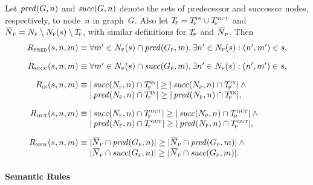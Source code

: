 \begin{definition}
  \def\fT{T_{\!\mathsc{f}}}%
  \def\pT{T_{\!\mathsc{p}}}%
  \def\fNegN{\mkern2mu\overline{\mkern-2mu N}_{\mathsc{f}}}%
  \def\pNegN{\mkern2mu\overline{\mkern-2mu N}_{\mathsc{p}}}%

  Let $\operatorname{\textrm{\textit{pred}}}(G, n)$ and $\operatorname{\textrm{\textit{succ}}}(G, n)$ denote the sets of predecessor and
  successor \glspl{node}, respectively, to \gls{node}~$n$ in \gls{graph}~$G$.
  Also let \mbox{$\fT = \fTin \cup \fTout$} and \mbox{$\fNegN = \fN \setminus
    \fN(s) \setminus \fT$}, with similar definitions for $\pT$ and $\pNegN$.
  Then
  \begin{displaymath}
    \begin{array}{r@{}l}
        \mSynPredRule(s, n, m) \equiv \mbox{}
      & \forall m' \in \pN(s) \cap \mPred(\pG, m),
        \exists n' \in \fN(s) :
        \mPair{n'}{m'} \in s, \\[\abovedisplayskip]

        \mSynSuccRule(s, n, m) \equiv \mbox{}
      & \forall m' \in \pN(s) \cap \mSucc(\pG, m),
        \exists n' \in \fN(s) :
        \mPair{n'}{m'} \in s, \\[\abovedisplayskip]

        \mSynInRule(s, n, m) \equiv \mbox{}
      & \mCard{\mSucc(\fN, n) \cap \fTin} \geq
        \mCard{\mSucc(\pN, n) \cap \pTin} \mAnd \mbox{} \\
      & \mCard{\mPred(\fN, n) \cap \fTin} \geq
        \mCard{\mPred(\pN, n) \cap \pTin}, \\[\abovedisplayskip]

        \mSynOutRule(s, n, m) \equiv \mbox{}
      & \mCard{\mSucc(\fN, n) \cap \fTout} \geq
        \mCard{\mSucc(\pN, n) \cap \pTout} \mAnd \mbox{} \\
      & \mCard{\mPred(\fN, n) \cap \fTout} \geq
        \mCard{\mPred(\pN, n) \cap \pTout}, \\[\abovedisplayskip]

        \mSynNewRule(s, n, m) \equiv \mbox{}
      & \mCard{\fNegN \cap \mPred(\fG, n)} \geq
        \mCard{\pNegN \cap \mPred(\pG, m)} \mAnd \mbox{} \\
      & \mCard{\fNegN \cap \mSucc(\fG, n)} \geq
        \mCard{\pNegN \cap \mSucc(\pG, m)}.
    \end{array}
  \end{displaymath}%
\end{definition}


\paragraph{Semantic Rules}

